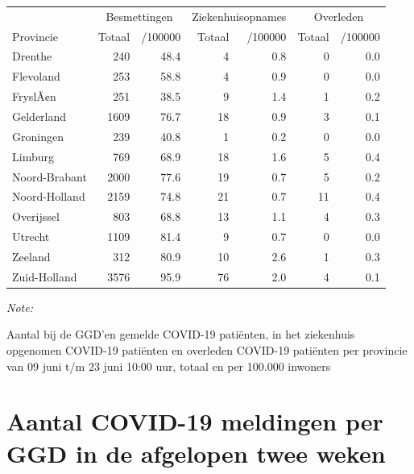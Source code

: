 \documentclass[
  english,
  man,floatsintext]{apa6}
\begin{document}
\begin{table}
\centering
\begin{threeparttable}
\begin{tabular}{lrrrrrr}
\toprule
\multicolumn{1}{c}{ } & \multicolumn{2}{c}{Besmettingen} & \multicolumn{2}{c}{Ziekenhuisopnames} & \multicolumn{2}{c}{Overleden} \\
\cmidrule(l{3pt}r{3pt}){2-3} \cmidrule(l{3pt}r{3pt}){4-5} \cmidrule(l{3pt}r{3pt}){6-7}
Provincie & Totaal & /100000 & Totaal & /100000 & Totaal & /100000\\
\midrule
Drenthe & 240 & 48.4 & 4 & 0.8 & 0 & 0.0\\
Flevoland & 253 & 58.8 & 4 & 0.9 & 0 & 0.0\\
FryslÃ¢n & 251 & 38.5 & 9 & 1.4 & 1 & 0.2\\
Gelderland & 1609 & 76.7 & 18 & 0.9 & 3 & 0.1\\
Groningen & 239 & 40.8 & 1 & 0.2 & 0 & 0.0\\
Limburg & 769 & 68.9 & 18 & 1.6 & 5 & 0.4\\
Noord-Brabant & 2000 & 77.6 & 19 & 0.7 & 5 & 0.2\\
Noord-Holland & 2159 & 74.8 & 21 & 0.7 & 11 & 0.4\\
Overijssel & 803 & 68.8 & 13 & 1.1 & 4 & 0.3\\
Utrecht & 1109 & 81.4 & 9 & 0.7 & 0 & 0.0\\
Zeeland & 312 & 80.9 & 10 & 2.6 & 1 & 0.3\\
Zuid-Holland & 3576 & 95.9 & 76 & 2.0 & 4 & 0.1\\
\bottomrule
\end{tabular}
\begin{tablenotes}
\item \textit{Note: } 
\item Aantal bij de GGD’en gemelde COVID-19 patiënten, in het ziekenhuis opgenomen COVID-19 patiënten en overleden COVID-19 patiënten per provincie van 09 juni t/m 23 juni 10:00 uur, totaal en per 100.000 inwoners
\end{tablenotes}
\end{threeparttable}
\end{table}

\newpage

\hypertarget{aantal-covid-19-meldingen-per-ggd-in-de-afgelopen-twee-weken}{%
\section{Aantal COVID-19 meldingen per GGD in de afgelopen twee weken}\label{aantal-covid-19-meldingen-per-ggd-in-de-afgelopen-twee-weken}}
\end{document}
